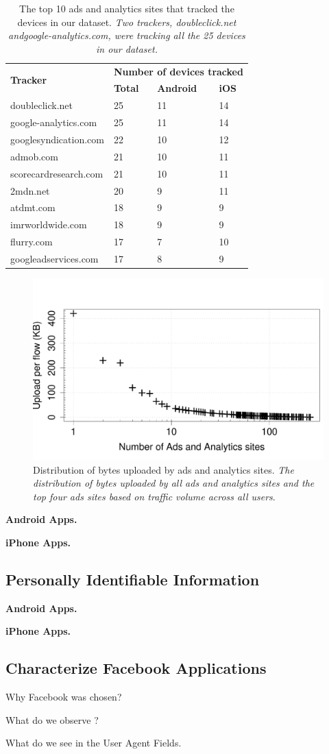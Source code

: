 \begin{table}
\begin{small}
\begin{tabular}{|p{}|p{}|p{}|p{}|}
\hline
\multirow{2}{*}{\bf Tracker} & \multicolumn{3}{c|}{\bf Number of devices tracked}\tabularnewline
\cline{2-4}
   &  {\bf Total} & {\bf Android} & {\bf iOS} \tabularnewline
\hline
doubleclick.net & 25 & 11 & 14 \tabularnewline
\hline
google-analytics.com   & 25 & 11 & 14 \tabularnewline
\hline
googlesyndication.com  & 22 & 10 & 12 \tabularnewline
\hline
admob.com  & 21 & 10 & 11 \tabularnewline
\hline
scorecardresearch.com &  21 & 10 & 11 \tabularnewline
\hline
2mdn.net  &  20 & 9 &  11 \tabularnewline
\hline
atdmt.com  & 18 & 9 &  9 \tabularnewline
\hline
imrworldwide.com & 18 &  9 &  9 \tabularnewline
\hline
flurry.com & 17 & 7 &  10 \tabularnewline
\hline
googleadservices.com  & 17 & 8 &  9 \tabularnewline
\hline
\end{tabular}
\end{small}
\caption{The top 10 ads and analytics sites that tracked the devices in our dataset.
\emph{Two trackers, \emph{doubleclick.net} and\emph{google-analytics.com}, were tracking all the 25 devices in our dataset.}}
\label{tab:top_trackers}
\end{table}
\begin{figure}
\includegraphics[width=\columnwidth]{plots/num_uploading_trackers.pdf}
\caption{Distribution of bytes uploaded by ads and analytics sites. \emph{The distribution of bytes uploaded by all ads and analytics sites and the top four ads sites based on traffic volume across all users}.}
\label{fig:description}
\end{figure}


  {\bf Android Apps.}

  {\bf iPhone Apps.}


\subsection{Personally Identifiable Information}

  {\bf Android Apps.}

  {\bf iPhone Apps.}

\subsection{Characterize Facebook Applications}

Why Facebook was chosen?

What do we observe ?

What do we see in the User Agent Fields. 


